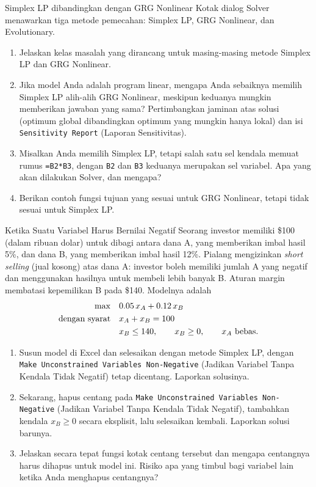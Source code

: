 \begin{ex}{Simplex LP dibandingkan dengan GRG Nonlinear}{}
\label{ex:excel-solver-methods}
 Kotak dialog Solver menawarkan tiga metode pemecahan: Simplex LP, GRG Nonlinear, dan Evolutionary.
\begin{enumerate}
\item Jelaskan kelas masalah yang dirancang untuk masing-masing metode Simplex LP dan GRG Nonlinear.
\item Jika model Anda adalah program linear, mengapa Anda sebaiknya memilih Simplex LP alih-alih GRG Nonlinear, meskipun keduanya mungkin memberikan jawaban yang sama?  Pertimbangkan jaminan atas solusi (optimum global dibandingkan optimum yang mungkin hanya lokal) dan isi \texttt{Sensitivity Report} (Laporan Sensitivitas).
\item Misalkan Anda memilih Simplex LP, tetapi salah satu sel kendala memuat rumus \texttt{=B2*B3}, dengan \texttt{B2} dan \texttt{B3} keduanya merupakan sel variabel.  Apa yang akan dilakukan Solver, dan mengapa?
\item Berikan contoh fungsi tujuan yang sesuai untuk GRG Nonlinear, tetapi tidak sesuai untuk Simplex LP.
\end{enumerate}
\exrefs{\S\ref{sec:excel-solver}}
\end{ex}


\begin{ex}{Ketika Suatu Variabel Harus Bernilai Negatif}{}
\label{ex:excel-short-selling}
 Seorang investor memiliki \$100 (dalam ribuan dolar) untuk dibagi antara dana A, yang memberikan imbal hasil 5\%, dan dana B, yang memberikan imbal hasil 12\%.  Pialang mengizinkan \emph{short selling} (jual kosong) atas dana A: investor boleh memiliki jumlah A yang negatif dan menggunakan hasilnya untuk membeli lebih banyak B.  Aturan margin membatasi kepemilikan B pada \$140.  Modelnya adalah
\begin{align*}
\max \quad & 0.05\,x_A + 0.12\,x_B\\
\mbox{dengan syarat}\quad & x_A + x_B = 100\\
& x_B \leq 140, \qquad x_B \geq 0, \qquad x_A \mbox{ bebas}.
\end{align*}
\begin{enumerate}
\item Susun model di Excel dan selesaikan dengan metode Simplex LP, dengan \texttt{Make Unconstrained Variables Non-Negative} (Jadikan Variabel Tanpa Kendala Tidak Negatif) tetap dicentang.  Laporkan solusinya.
\item Sekarang, hapus centang pada \texttt{Make Unconstrained Variables Non-Negative} (Jadikan Variabel Tanpa Kendala Tidak Negatif), tambahkan kendala $x_B \geq 0$ secara eksplisit, lalu selesaikan kembali.  Laporkan solusi barunya.
\item Jelaskan secara tepat fungsi kotak centang tersebut dan mengapa centangnya harus dihapus untuk model ini.  Risiko apa yang timbul bagi variabel lain ketika Anda menghapus centangnya?
\end{enumerate}
\exrefs{\S\ref{sec:excel-solver}}
\end{ex}


